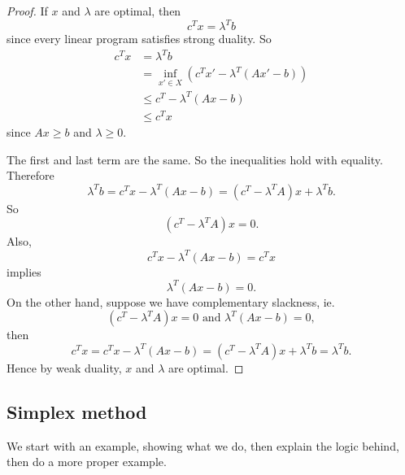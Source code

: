 \documentclass[a4paper]{article}
\begin{document}
\begin{proof}
  If $x$ and $\lambda$ are optimal, then
  \[
    c^Tx = \lambda^T b
  \]
  since every linear program satisfies strong duality. So
  \begin{align*}
    c^Tx &= \lambda^T b\\
    &= \inf_{x'\in X} (c^T x' - \lambda^T(Ax' - b))\\
    &\leq c^T - \lambda^T (Ax - b)\\
    &\leq c^T x
  \end{align*}
  since $Ax \geq b$ and $\lambda\geq 0$.

  The first and last term are the same. So the inequalities hold with equality. Therefore
  \[
    \lambda^T b = c^Tx - \lambda^T (Ax - b) = (c^T - \lambda^TA)x + \lambda^Tb.
  \]
  So
  \[
    (c^T - \lambda^TA)x = 0.
  \]
  Also,
  \[
    c^Tx - \lambda^T(Ax - b) = c^Tx
  \]
  implies
  \[
    \lambda^T(Ax - b) = 0.
  \]
  On the other hand, suppose we have complementary slackness, ie.
  \[
    (c^T - \lambda^T A)x = 0\text{ and }\lambda^T(Ax - b) = 0,
  \]
  then
  \[
    c^Tx = c^Tx - \lambda^T(Ax - b) = (c^T - \lambda^T A)x + \lambda^T b = \lambda^Tb.
  \]
  Hence by weak duality, $x$ and $\lambda$ are optimal.
\end{proof}
\subsection{Simplex method}
We start with an example, showing what we do, then explain the logic behind, then do a more proper example.
\end{document}
